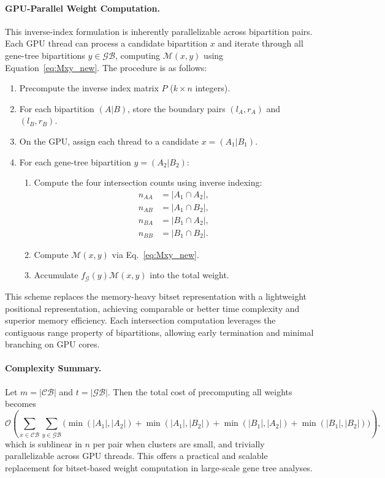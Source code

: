\documentclass[11pt]{article}
\begin{document}
\paragraph{GPU-Parallel Weight Computation.}
This inverse-index formulation is inherently parallelizable across bipartition
pairs. Each GPU thread can process a candidate bipartition $x$ and iterate
through all gene-tree bipartitions $y \in \mathcal{GB}$, computing
$\mathcal{M}(x,y)$ using Equation~\eqref{eq:Mxy_new}.  
The procedure is as follows:
\begin{enumerate}
    \item Precompute the inverse index matrix $P$ ($k \times n$ integers).
    \item For each bipartition $(A|B)$, store the boundary pairs $(l_A, r_A)$
          and $(l_B, r_B)$.
    \item On the GPU, assign each thread to a candidate $x = (A_1|B_1)$.
    \item For each gene-tree bipartition $y = (A_2|B_2)$:
    \begin{enumerate}
        \item Compute the four intersection counts using inverse indexing:
        \[
        \begin{aligned}
        n_{AA} &= |A_1 \cap A_2|, \\
        n_{AB} &= |A_1 \cap B_2|, \\
        n_{BA} &= |B_1 \cap A_2|, \\
        n_{BB} &= |B_1 \cap B_2|.
        \end{aligned}
        \]
        \item Compute $\mathcal{M}(x,y)$ via Eq.~\eqref{eq:Mxy_new}.
        \item Accumulate $f_{\mathcal{G}}(y)\mathcal{M}(x,y)$ into the total weight.
    \end{enumerate}
\end{enumerate}

This scheme replaces the memory-heavy bitset representation with a
lightweight positional representation, achieving comparable or better
time complexity and superior memory efficiency.
Each intersection computation leverages the contiguous range property
of bipartitions, allowing early termination and minimal branching on GPU cores.

\paragraph{Complexity Summary.}
Let $m = |\mathcal{CB}|$ and $t = |\mathcal{GB}|$.  
Then the total cost of precomputing all weights becomes
\[
\mathcal{O}\!\left(
\sum_{x \in \mathcal{CB}} \sum_{y \in \mathcal{GB}}
\big(
\min(|A_1|,|A_2|) + \min(|A_1|,|B_2|)
+ \min(|B_1|,|A_2|) + \min(|B_1|,|B_2|)
\big)
\right),
\]
which is sublinear in $n$ per pair when clusters are small,
and trivially parallelizable across GPU threads.
This offers a practical and scalable replacement for
bitset-based weight computation in large-scale gene tree analyses.
\end{document}

